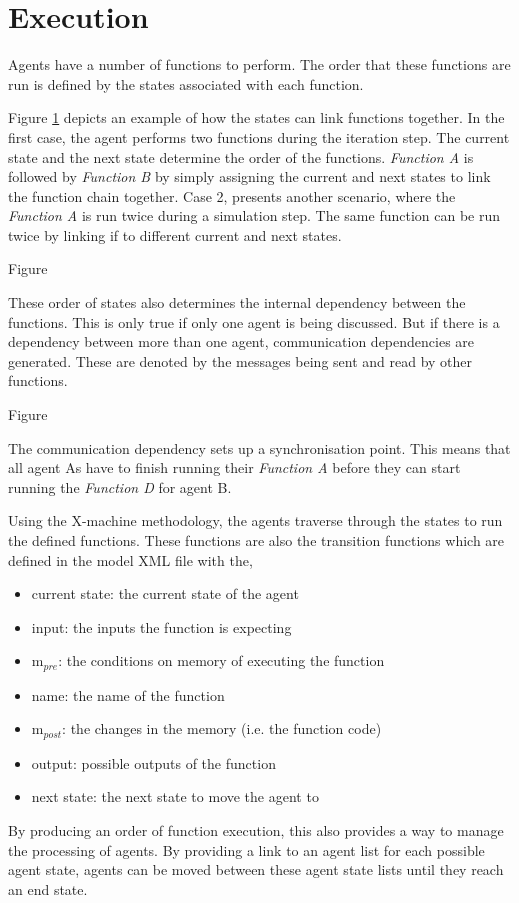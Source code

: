 \section{Execution}

Agents have a number of functions to perform. The order that these functions are run is defined by the states associated with each function.

Figure \ref{} depicts an example of how the states can link functions together. In the first case, the agent performs two functions during the iteration step. The current state and the next state determine the order of the functions. \emph{Function A} is followed by \emph{Function B} by simply assigning the current and next states to link the function chain together. Case 2, presents another scenario, where the \emph{Function A} is run twice during a simulation step. The same function can be run twice by linking if to different current and next states.

Figure

These order of states also determines the internal dependency between the functions. This is only true if only one agent is being discussed. But if there is a dependency between more than one agent, communication dependencies are generated. These are denoted by the messages being sent and read by other functions.


Figure

The communication dependency sets up a synchronisation point. This means that all agent As have to finish running their \emph{Function A} before they can start running the \emph{Function D} for agent B.

Using the X-machine methodology, the agents traverse through the states to run the defined functions. These functions are also the transition functions which are defined in the model XML file with the,

\begin{itemize}
\item current state: the current state of the agent
\item input: the inputs the function is expecting
\item m$_{pre}$: the conditions on memory of executing the function
\item name: the name of the function
\item m$_{post}$: the changes in the memory (i.e. the function code)
\item output: possible outputs of the function
\item next state: the next state to move the agent to
\end{itemize}

By producing an order of function execution, this also provides a way to manage the processing of agents. By providing a link to an
agent list for each possible agent state, agents can be moved between these agent
state lists until they reach an end state.

